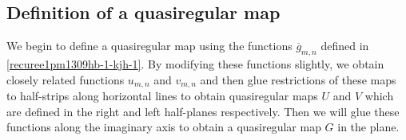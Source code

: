 \documentclass[12pt]{amsart}
\numberwithin{equation}{section}
\begin{document}
\subsection{Definition of a quasiregular map}\label{Definition of a quasiregular map-add} %

We begin to define a quasiregular map using the functions $\overline{g}_{m,n}$ defined in \eqref{recuree1pm1309hb-1-kjh-1}. By modifying these functions slightly, we obtain closely related functions $u_{m,n}$ and $v_{m,n}$ and then glue restrictions of these maps to half-strips along horizontal lines to obtain quasiregular maps $U$ and $V$ which are defined
in the right and left half-planes respectively. Then we will glue these functions along the imaginary axis to obtain a quasiregular map $G$ in the plane.
\end{document}
